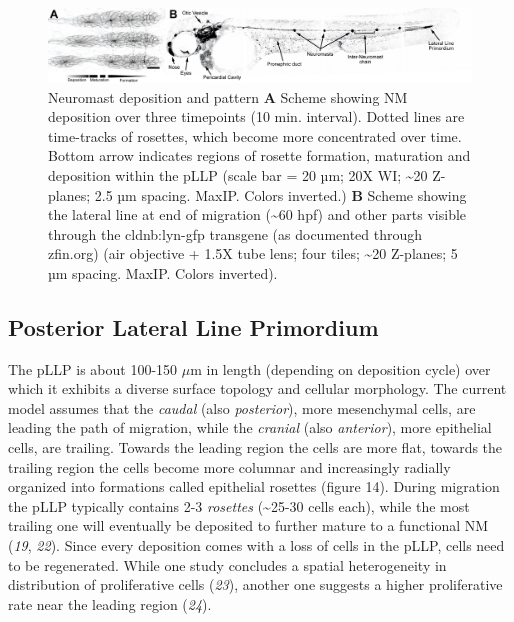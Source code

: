 \documentclass[11pt,singlespacinge,twoside]{reedthesis} %
\begin{document}
\begin{figure}

{\centering \includegraphics[width=.95\textwidth]{figures/intro/ll_gfp} 

}

\caption[Neuromast deposition and pattern]{Neuromast deposition and pattern \textbf{A} Scheme showing NM deposition over three timepoints (10 min. interval). Dotted lines are time-tracks of rosettes, which become more concentrated over time. Bottom arrow indicates regions of rosette formation, maturation and deposition within the pLLP (scale bar = 20 µm; 20X WI; \textasciitilde{}20 Z-planes; 2.5 µm spacing. MaxIP. Colors inverted.) \textbf{B} Scheme showing the lateral line at end of migration (\textasciitilde{}60 hpf) and other parts visible through the cldnb:lyn-gfp transgene (as documented through zfin.org) (air objective + 1.5X tube lens; four tiles; \textasciitilde{}20 Z-planes; 5 µm spacing. MaxIP. Colors inverted).}\label{fig:llgfp}
\end{figure}
\hypertarget{posterior-lateral-line-primordium}{%
\subsection{Posterior Lateral Line Primordium}\label{posterior-lateral-line-primordium}}

The pLLP is about 100-150 \(\mu\)m in length (depending on deposition cycle) over which it exhibits a diverse surface topology and cellular morphology. The current model assumes that the \emph{caudal} (also \emph{posterior}), more mesenchymal cells, are leading the path of migration, while the \emph{cranial} (also \emph{anterior}), more epithelial cells, are trailing. Towards the leading region the cells are more flat, towards the trailing region the cells become more columnar and increasingly radially organized into formations called epithelial rosettes (figure 14). During migration the pLLP typically contains 2-3 \emph{rosettes} (\textasciitilde{}25-30 cells each), while the most trailing one will eventually be deposited to further mature to a functional NM (\emph{19}, \emph{22}). Since every deposition comes with a loss of cells in the pLLP, cells need to be regenerated. While one study concludes a spatial heterogeneity in distribution of proliferative cells (\emph{23}), another one suggests a higher proliferative rate near the leading region (\emph{24}).
\end{document}
